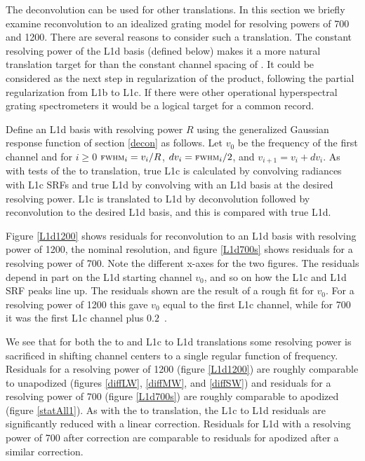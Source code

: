 \documentclass[journal]{IEEEtran}
\begin{document}

The {\airs} deconvolution can be used for other translations.  
In this section we briefly examine reconvolution to an idealized
grating model for resolving powers of 700 and 1200.  There are
several reasons to consider such a translation.  The constant
resolving power of the L1d basis (defined below) makes it a more
natural translation target for {\airs} than the constant channel
spacing of {\cris}.  It could be considered as the next step in
regularization of the {\airs} product, following the partial
regularization from L1b to L1c.  If there were other operational
hyperspectral grating spectrometers it would be a logical target 
for a common record.

Define an {\airs} L1d basis with resolving power $R$ using the
generalized Gaussian response function of section \ref{decon} as
follows.  Let $v_0$ be the frequency of the first channel and for
$i\ge0$ $\mbox{\small\textsc{fwhm}}_i = v_i / R$, $dv_i = \mbox{\small\textsc{fwhm}}_i / 2$, and $v_{i+1} =
v_i + dv_i$.  As with tests of the {\airs} to {\cris} translation,
true L1c is calculated by convolving {\kcarta} radiances with
{\airs} L1c SRFs and true L1d by convolving with an L1d basis at the
desired resolving power.  L1c is translated to L1d by deconvolution
followed by reconvolution to the desired L1d basis, and this is
compared with true L1d.

Figure \ref{L1d1200} shows residuals for reconvolution to an L1d
basis with resolving power of 1200, the nominal {\airs} resolution,
and figure \ref{L1d700s} shows residuals for a resolving power of
700.  Note the different x-axes for the two figures.  The residuals
depend in part on the L1d starting channel $v_0$, and so on how the
L1c and L1d SRF peaks line up.  The residuals shown are the result
of a rough fit for $v_0$.  For a resolving power of 1200 this gave
$v_0$ equal to the first L1c channel, while for 700 it was the first
L1c channel plus $0.2$~\wn.

We see that for both the {\airs} to {\cris} and L1c to L1d
translations some resolving power is sacrificed in shifting channel
centers to a single regular function of frequency.  Residuals for a
resolving power of 1200 (figure \ref{L1d1200}) are roughly
comparable to unapodized {\cris} (figures \ref{diffLW},
\ref{diffMW}, and \ref{diffSW}) and residuals for a resolving power
of 700 (figure \ref{L1d700s}) are roughly comparable to apodized
{\cris} (figure \ref{statAll1}).  As with the {\airs} to {\cris}
translation, the L1c to L1d residuals are significantly reduced with
a linear correction.  Residuals for L1d with a resolving power of
700 after correction are comparable to residuals for apodized
{\cris} after a similar correction.
\end{document}
